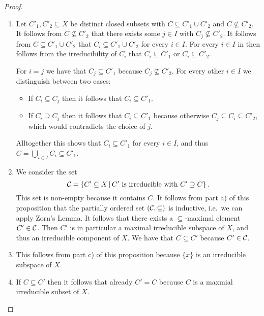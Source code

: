 \begin{proof}
  \leavevmode
  \begin{enumerate}
    \item
      Let $C'_1, C'_2 \subseteq X$ be distinct closed subsets with $C \subseteq C'_1 \cup C'_2$ and $C \nsubseteq C'_2$.
      It follows from $C \nsubseteq C'_2$ that there exists some $j \in I$ with $C_j \nsubseteq C'_2$.
      It follows from $C \subseteq C'_1 \cup C'_2$ that $C_i \subseteq C'_1 \cup C'_2$ for every $i \in I$.
      For every $i \in I$ in then follows from the irreducibility of $C_i$ that $C_i \subseteq C'_1$ or $C_i \subseteq C'_2$.
      
      For $i = j$ we have that $C_j \subseteq C'_1$ because $C_j \nsubseteq C'_2$.
      For every other $i \in I$ we distinguish between two cases:
      \begin{itemize}
        \item
          If $C_i \subseteq C_j$ then it follows that $C_i \subseteq C'_1$.
        \item
          If $C_i \supseteq C_j$ then it follows that $C_i \subseteq C'_1$ because otherwise $C_j \subseteq C_i \subseteq C'_2$, which would contradicts the choice of $j$.
      \end{itemize}
      Alltogether this shows that $C_i \subseteq C'_1$ for every $i \in I$, and thus $C = \bigcup_{i \in I} C_i \subseteq C'_1$.
    \item
      We consider the set
      \[
          \mc{C}
        = \{
            C' \subseteq X
          \suchthat
            \text{$C'$ is irreducible with $C' \supseteq C$}
          \} \,.
      \]
      This set is non-empty because it contains $C$.
      It follows from part a) of this proposition that the partially ordered set $(\mathcal{C},\subseteq)$ is inductive, i.e.\ we can apply Zorn’s Lemma.
      It follows that there exists a $\subseteq$-maximal element $C' \in \mathcal{C}$.
      Then $C'$ is in particular a maximal irreducible subspace of $X$, and thus an irreducible component of $X$.
      We have that $C \subseteq C'$ because $C' \in \mathcal{C}$.
    \item
      This follows from part c) of this proposition because $\{x\}$ is an irreducible subspace of $X$.
    \item
      If $C \subseteq C'$ then it follows that already $C' = C$ because $C$ is a maxmial irreducible subset of $X$.
    \qedhere
  \end{enumerate}
\end{proof}


